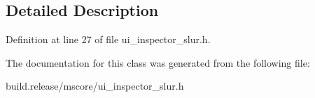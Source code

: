 \subsection{Detailed Description}


Definition at line 27 of file ui\+\_\+inspector\+\_\+slur.\+h.



The documentation for this class was generated from the following file\+:\begin{DoxyCompactItemize}
\item 
build.\+release/mscore/ui\+\_\+inspector\+\_\+slur.\+h\end{DoxyCompactItemize}
